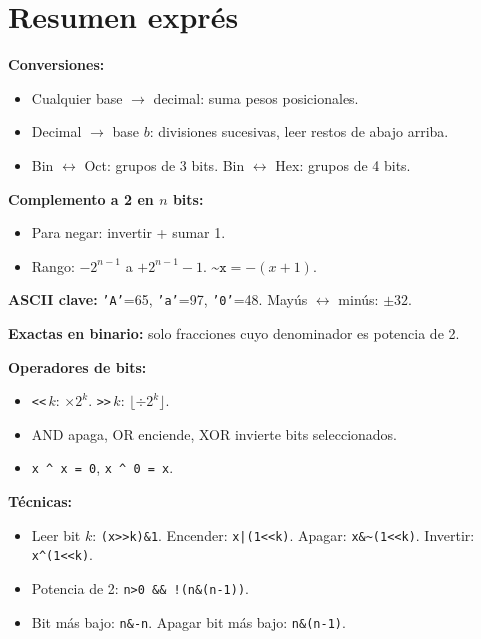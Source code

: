 \documentclass[12pt, oneside]{article}
\begin{document}
\section{Resumen exprés}

\begin{recuerda}
\textbf{Conversiones:}
\begin{itemize}
  \item Cualquier base $\to$ decimal: suma pesos posicionales.
  \item Decimal $\to$ base $b$: divisiones sucesivas, leer restos de abajo arriba.
  \item Bin $\leftrightarrow$ Oct: grupos de 3 bits. \quad Bin $\leftrightarrow$ Hex: grupos de 4 bits.
\end{itemize}

\textbf{Complemento a 2 en $n$ bits:}
\begin{itemize}
  \item Para negar: invertir + sumar 1.
  \item Rango: $-2^{n-1}$ a $+2^{n-1}-1$. \quad $\texttt{\textasciitilde{}x} = -(x+1)$.
\end{itemize}

\textbf{ASCII clave:} \texttt{'A'}=65, \texttt{'a'}=97, \texttt{'0'}=48. Mayús $\leftrightarrow$ minús: $\pm 32$.

\textbf{Exactas en binario:} solo fracciones cuyo denominador es potencia de 2.

\textbf{Operadores de bits:}
\begin{itemize}
  \item \texttt{<<}\,$k$: $\times 2^k$. \quad \texttt{>>}\,$k$: $\lfloor \div 2^k \rfloor$.
  \item AND apaga, OR enciende, XOR invierte bits seleccionados.
  \item \texttt{x \textasciicircum{} x = 0}, \quad \texttt{x \textasciicircum{} 0 = x}.
\end{itemize}

\textbf{Técnicas:}
\begin{itemize}
  \item Leer bit $k$: \texttt{(x>>k)\&1}. \quad Encender: \texttt{x|(1<<k)}.
        Apagar: \texttt{x\&\textasciitilde(1<<k)}. \quad Invertir: \texttt{x\textasciicircum(1<<k)}.
  \item Potencia de 2: \texttt{n>0 \&\& !(n\&(n-1))}.
  \item Bit más bajo: \texttt{n\&-n}. \quad Apagar bit más bajo: \texttt{n\&(n-1)}.
\end{itemize}
\end{recuerda}
\end{document}
